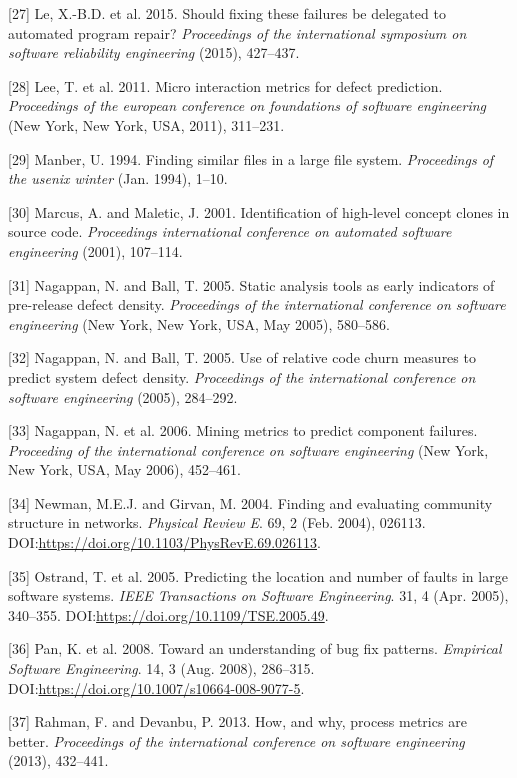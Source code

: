 \documentclass[sigconf]{acmart}
\begin{document}
[27] Le, X.-B.D. et al. 2015. Should fixing these failures be
delegated to automated program repair? \emph{Proceedings of the
international symposium on software reliability engineering} (2015),
427--437.


[28] Lee, T. et al. 2011. Micro interaction metrics for defect
prediction. \emph{Proceedings of the european conference on foundations
of software engineering} (New York, New York, USA, 2011), 311--231.


[29] Manber, U. 1994. Finding similar files in a large file system.
\emph{Proceedings of the usenix winter} (Jan. 1994), 1--10.


[30] Marcus, A. and Maletic, J. 2001. Identification of high-level
concept clones in source code. \emph{Proceedings international
conference on automated software engineering} (2001), 107--114.


[31] Nagappan, N. and Ball, T. 2005. Static analysis tools as early
indicators of pre-release defect density. \emph{Proceedings of the
international conference on software engineering} (New York, New York,
USA, May 2005), 580--586.


[32] Nagappan, N. and Ball, T. 2005. Use of relative code churn
measures to predict system defect density. \emph{Proceedings of the
international conference on software engineering} (2005), 284--292.


[33] Nagappan, N. et al. 2006. Mining metrics to predict component
failures. \emph{Proceeding of the international conference on software
engineering} (New York, New York, USA, May 2006), 452--461.


[34] Newman, M.E.J. and Girvan, M. 2004. Finding and evaluating
community structure in networks. \emph{Physical Review E}. 69, 2 (Feb.
2004), 026113. DOI:\url{https://doi.org/10.1103/PhysRevE.69.026113}.


[35] Ostrand, T. et al. 2005. Predicting the location and number of
faults in large software systems. \emph{IEEE Transactions on Software
Engineering}. 31, 4 (Apr. 2005), 340--355.
DOI:\url{https://doi.org/10.1109/TSE.2005.49}.


[36] Pan, K. et al. 2008. Toward an understanding of bug fix
patterns. \emph{Empirical Software Engineering}. 14, 3 (Aug. 2008),
286--315. DOI:\url{https://doi.org/10.1007/s10664-008-9077-5}.


[37] Rahman, F. and Devanbu, P. 2013. How, and why, process metrics
are better. \emph{Proceedings of the international conference on
software engineering} (2013), 432--441.
\end{document}
